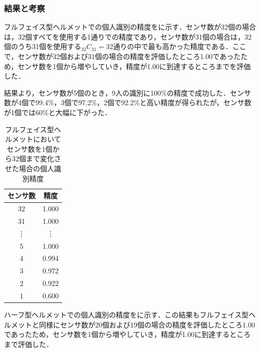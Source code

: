 \documentclass[Japanese,noauthor]{dicomopapers}
\begin{document}
\subsubsection{結果と考察}
フルフェイス型ヘルメットでの個人識別の精度をに示す．センサ数が32個の場合は，32個すべてを使用する1通りでの精度であり，センサ数が31個の場合は，32個のうち31個を使用する$_{32}C_{31}=$32通りの中で最も高かった精度である．ここで，センサ数が32個および31個の場合の精度を評価したところ1.00であったため，センサ数を1個から増やしていき，精度が1.00に到達するところまでを評価した．

結果より，センサ数が5個のとき，9人の識別に100\%の精度で成功した．センサ数が4個で99.4\%，3個で97.2\%，2個で92.2\%と高い精度が得られたが，センサ数が1個では60\%と大幅に下がった．

\begin{table}[!t]
  \centering
  \caption{フルフェイス型ヘルメットにおいてセンサ数を1個から32個まで変化させた場合の個人識別精度}
  \begin{tabular}{c|c} \hline\hline
    センサ数 & 精度 \\ \hline
    32 & 1.000 \\
    31 & 1.000 \\
    \vdots & \vdots \\
    5 & 1.000 \\
    4 & 0.994 \\
    3 & 0.972 \\
    2 & 0.922 \\
    1 & 0.600 \\ \hline
  \end{tabular}
  \label{full_num}
\end{table}



ハーフ型ヘルメットでの個人識別の精度をに示す．この結果もフルフェイス型ヘルメットと同様にセンサ数が20個および19個の場合の精度を評価したところ1.00であったため，センサ数を1個から増やしていき，精度が1.00に到達するところまで評価した．
\end{document}
